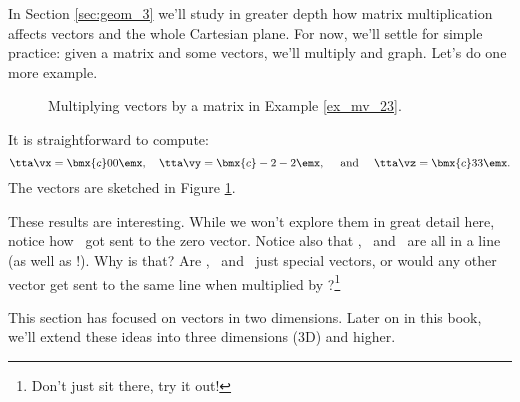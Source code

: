 In Section \ref{sec:geom_3} we'll study in greater depth how matrix multiplication affects vectors and the whole Cartesian plane. For now, we'll settle for simple practice: given a matrix and some vectors, we'll multiply and graph. Let's do one more example.\\


{\begin{figure}[h!]
\begin{center}
\end{center}
\caption{Multiplying vectors by a matrix in Example \ref{ex_mv_23}.}
\label{fig:mv_23}
\end{figure}

It is straightforward to compute: $$\tta\vx = \bmx{c} 0\\0\emx,\quad \tta\vy = \bmx{c} -2\\-2\emx, \quad \text{ and } \quad \tta\vz = \bmx{c} 3\\3\emx.$$ The vectors are sketched in Figure \ref{fig:mv_23}.

These results are interesting. While we won't explore them in great detail here, notice how \vx\ got sent to the zero vector. Notice also that \tta\vx, \tta\vy\ and \tta\vz\ are all in a line (as well as \vx!). Why is that? Are \vx, \vy\ and \vz\ just special vectors, or would any other vector get sent to the same line when multiplied by \tta?\footnote{Don't just sit there, try it out!}
}


This section has focused on vectors in two dimensions. Later on in this book, we'll extend these ideas into three dimensions (3D) and higher. 
%

